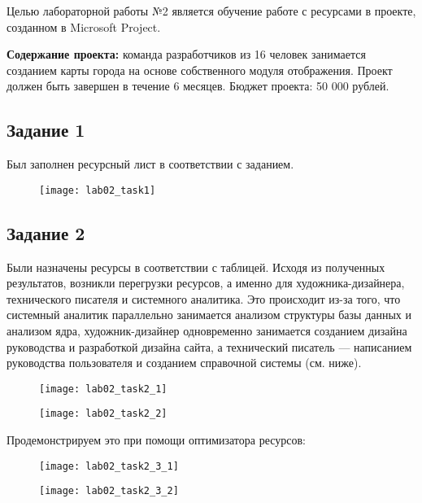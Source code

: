 Целью лабораторной работы №2 является обучение работе с ресурсами в проекте, созданном в Microsoft Project.

\textbf{Содержание проекта:} команда разработчиков из 16 человек занимается созданием карты города на основе собственного модуля отображения. Проект должен быть завершен в течение 6 месяцев. Бюджет проекта: 50 000 рублей.


\subsection*{Задание 1}

Был заполнен ресурсный лист в соответствии с заданием.

\begin{figure}[h!]
	\texttt{[image: lab02\_task1]}
\end{figure}

\subsection*{Задание 2}

Были назначены ресурсы в соответствии с таблицей.
Исходя из полученных результатов, возникли перегрузки ресурсов, а именно для художника-дизайнера, технического  писателя и системного аналитика. Это происходит из-за того, что системный аналитик параллельно занимается анализом структуры базы данных и анализом ядра, художник-дизайнер одновременно занимается созданием дизайна руководства и разработкой дизайна сайта, а технический писатель --- написанием руководства пользователя и созданием справочной системы (см. ниже).

\begin{figure}[h!]
	\texttt{[image: lab02\_task2\_1]}
\end{figure}

\begin{figure}[h!]
	\texttt{[image: lab02\_task2\_2]}
\end{figure}
\clearpage

Продемонстрируем это при помощи оптимизатора ресурсов:

\begin{figure}[h!]
	\texttt{[image: lab02\_task2\_3\_1]}
\end{figure}

\begin{figure}[h!]
	\texttt{[image: lab02\_task2\_3\_2]}
\end{figure}

